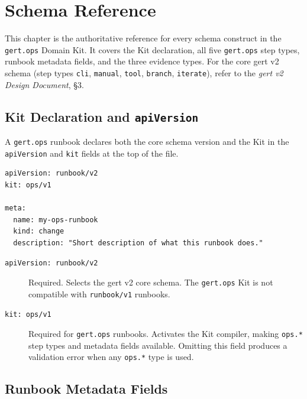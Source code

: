 \chapter{Schema Reference}
\label{ch:schema-reference}

This chapter is the authoritative reference for every schema construct in the \texttt{gert.ops}
Domain Kit. It covers the Kit declaration, all five \texttt{gert.ops} step types, runbook
metadata fields, and the three evidence types. For the core gert v2 schema (step types
\texttt{cli}, \texttt{manual}, \texttt{tool}, \texttt{branch}, \texttt{iterate}), refer to the
\emph{gert v2 Design Document}, §3.

\section{Kit Declaration and \texttt{apiVersion}}
\label{sec:schema-apiversion}

A \texttt{gert.ops} runbook declares both the core schema version and the Kit in the
\texttt{apiVersion} and \texttt{kit} fields at the top of the file.

\begin{verbatim}
apiVersion: runbook/v2
kit: ops/v1

meta:
  name: my-ops-runbook
  kind: change
  description: "Short description of what this runbook does."
\end{verbatim}

\begin{description}
  \item[\texttt{apiVersion: runbook/v2}] Required. Selects the gert v2 core schema. The
    \texttt{gert.ops} Kit is not compatible with \texttt{runbook/v1} runbooks.
  \item[\texttt{kit: ops/v1}] Required for \texttt{gert.ops} runbooks. Activates the Kit
    compiler, making \texttt{ops.*} step types and metadata fields available. Omitting this
    field produces a validation error when any \texttt{ops.*} type is used.
\end{description}

\section{Runbook Metadata Fields}
\label{sec:schema-metadata}


